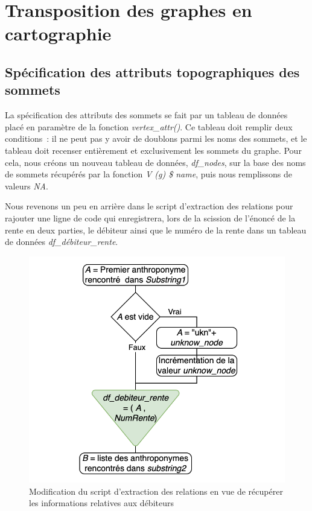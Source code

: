 \section{Transposition des graphes en cartographie}
\subsection{Spécification des attributs topographiques des sommets}
La spécification des attributs des sommets se fait par un tableau de données placé en paramètre de la fonction \textit{vertex\_attr()}. Ce tableau doit remplir deux conditions : il ne peut pas y avoir de doublons parmi  les noms des sommets, et  le tableau doit recenser entièrement et exclusivement  les sommets du graphe.
Pour cela,  nous créons un nouveau tableau de données, \textit{df\_nodes}, sur la base des noms de sommets récupérés par la fonction \textit{V (g) \$ name}, puis nous remplissons de valeurs \textit{NA}.

Nous revenons un peu en arrière dans le script d'extraction des relations pour rajouter une ligne de code qui enregistrera, lors de la scission de l'énoncé de la rente en deux parties, le débiteur  ainsi que le numéro de la rente  dans un tableau de données \textit{df\_débiteur\_rente}. 
\begin{figure}
    \centering
    \includegraphics[scale=0.75]{3.Results/Img/extrac_rel_mod.png}
    \caption{Modification du script d'extraction des relations en vue de récupérer les informations relatives aux débiteurs}
    \label{fig:mod_rel}
\end{figure}

